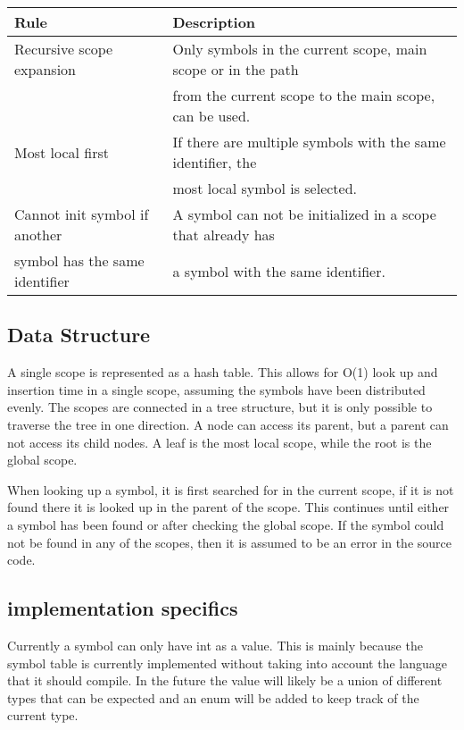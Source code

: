 \documentclass{article}
\begin{document}

  \begin{tabular}{| l | l |}
    \hline
    Rule & Description \\ \hline
     Recursive scope expansion & Only symbols in the current scope, main scope or in the path \\ 
     & from the current scope to the main scope, can be used. \\  \hline
    Most local first & If there are multiple symbols with the same identifier, the \\
     & most local symbol is selected. \\ \hline
    Cannot init symbol if another & A symbol can not be initialized in a scope that already has \\
     symbol has the same identifier & a symbol with the same identifier. \\ 
    \hline
  \end{tabular}





\subsection{ Data Structure }
A single scope is represented as a hash table. This allows for O(1) look up and insertion time in a single scope, assuming the symbols have been distributed evenly. The scopes are connected in a tree structure, but it is only possible to traverse the tree in one direction. A node can access its parent, but a parent can not access its child nodes. A leaf is the most local scope, while the root is the global scope.

When looking up a symbol, it is first searched for in the current scope, if it is not found there it is looked up in the parent of the scope. This continues until either a symbol has been found or after checking the global scope. If the symbol could not be found in any of the scopes, then it is assumed to be an error in the source code. 

\newpage
\subsection{implementation specifics}
Currently a symbol can only have int as a value. This is mainly because the symbol table is currently implemented without taking into account the language that it should compile. In the future the value will likely be a union of different types that can be expected and an enum will be added to keep track of the current type.
\end{document}
